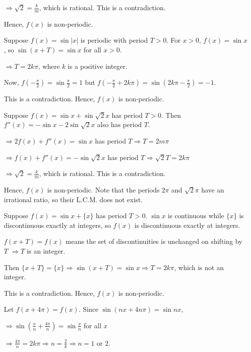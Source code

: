   $\Rightarrow \sqrt{2} = \frac{k}{m}$, which is rational. This is a contradiction.

  Hence, $f(x)$ is non-periodic.

\item Suppose $f(x) = \sin|x|$ is periodic with period $T > 0$. For $x > 0$, $f(x) = \sin x$, so
  $\sin(x + T) = \sin x$ for all $x > 0$.

  $\Rightarrow T = 2k\pi$, where $k$ is a positive integer.

  Now, $f\left(-\frac{\pi}{2}\right) = \sin\frac{\pi}{2} = 1$ but $f\left(-\frac{\pi}{2} + 2k\pi\right) =
  \sin\left(2k\pi - \frac{\pi}{2}\right) = -1$.

  This is a contradiction. Hence, $f(x)$ is non-periodic.

\item Suppose $f(x) = \sin x + \sin\sqrt{2}x$ has period $T > 0$. Then $f''(x) = -\sin x -
  2\sin\sqrt{2}x$ also has period $T$.

  $\Rightarrow 2f(x) + f''(x) = \sin x$ has period $T \Rightarrow T = 2m\pi$

  $\Rightarrow f(x) + f''(x) = -\sin\sqrt{2}x$ has period $T \Rightarrow \sqrt{2}T = 2k\pi$

  $\Rightarrow \sqrt{2} = \frac{k}{m}$, which is rational. This is a contradiction.

  Hence, $f(x)$ is non-periodic. Note that the periods $2\pi$ and $\sqrt{2}\pi$ have an irrational
  ratio, so their L.C.M. does not exist.

\item Suppose $f(x) = \sin x + \{x\}$ has period $T > 0$. $\sin x$ is continuous while $\{x\}$ is
  discontinuous exactly at integers, so $f(x)$ is discontinuous exactly at integers.

  $f(x + T) = f(x)$ means the set of discontinuities is unchanged on shifting by $T$
  $\Rightarrow T$ is an integer.

  Then $\{x + T\} = \{x\} \Rightarrow \sin(x + T) = \sin x \Rightarrow T = 2k\pi$, which is not an
  integer.

  This is a contradiction. Hence, $f(x)$ is non-periodic.

\item Let $f(x + 4\pi) = f(x)$. Since $\sin(nx + 4n\pi) = \sin nx$,

  $\Rightarrow \sin\left(\frac{x}{n} + \frac{4\pi}{n}\right) = \sin\frac{x}{n}$ for all $x$

  $\Rightarrow \frac{4\pi}{n} = 2k\pi \Rightarrow n = \frac{2}{k} \Rightarrow n = 1$ or $2$.

